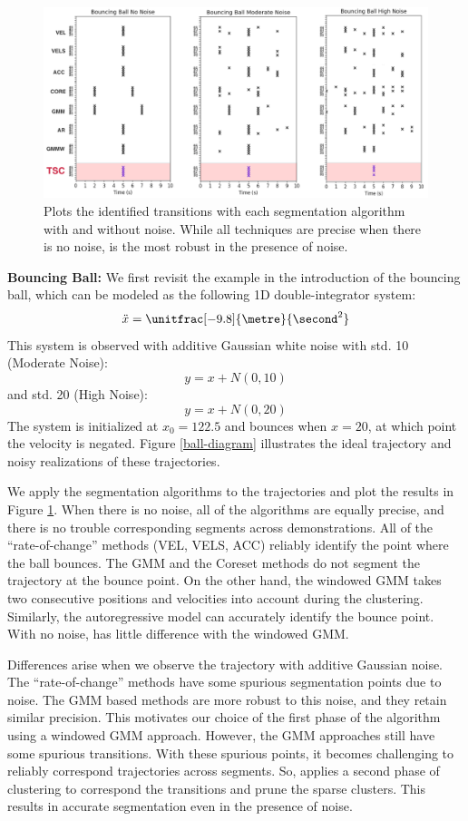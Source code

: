 \begin{figure}%
\centering
\includegraphics[width=\columnwidth]{tsc-experiments/ball-results.png}
\caption{Plots the identified transitions with each segmentation algorithm with and without noise. While all techniques are precise when there is no noise, \tsc is the most robust in the presence of noise. \label{ball-results}}
\end{figure}


\textbf{Bouncing Ball: }
We first revisit the example in the introduction of the bouncing ball, which can be modeled as the following 1D double-integrator system:
\[ \ddot{x} = \unitfrac[-9.8]{\metre}{\second^2} \]
This system is observed with additive Gaussian white noise with std. 10 (Moderate Noise):
\[
y = x + N(0,10)
\]
and std. 20 (High Noise):
\[
y = x + N(0,20)
\]
The system is initialized at $x_0 = 122.5$ and bounces when $x=20$, at which point the velocity is negated.
Figure \ref{ball-diagram} illustrates the ideal trajectory and noisy realizations of these trajectories.

We apply the segmentation algorithms to the trajectories and plot the results in Figure \ref{ball-results}.
When there is no noise, all of the algorithms are equally precise, and there is no trouble corresponding segments across demonstrations.
All of the ``rate-of-change'' methods (VEL, VELS, ACC) reliably identify the point where the ball bounces.
The GMM and the Coreset methods do not segment the trajectory at the bounce point. 
On the other hand, the windowed GMM takes two consecutive positions and velocities into account during the clustering.
Similarly, the autoregressive model can accurately identify the bounce point.
With no noise, \tsc has little difference with the windowed GMM.

Differences arise when we observe the trajectory with additive Gaussian noise.
The ``rate-of-change'' methods have some spurious segmentation points due to noise. 
The GMM based methods are more robust to this noise, and they retain similar precision.
This motivates our choice of the first phase of the \tsc algorithm using a windowed GMM approach.
However, the GMM approaches still have some spurious transitions.
With these spurious points, it becomes challenging to reliably correspond trajectories across segments.
So, \tsc applies a second phase of clustering to correspond the transitions and prune the sparse clusters.
This results in accurate segmentation even in the presence of noise.


